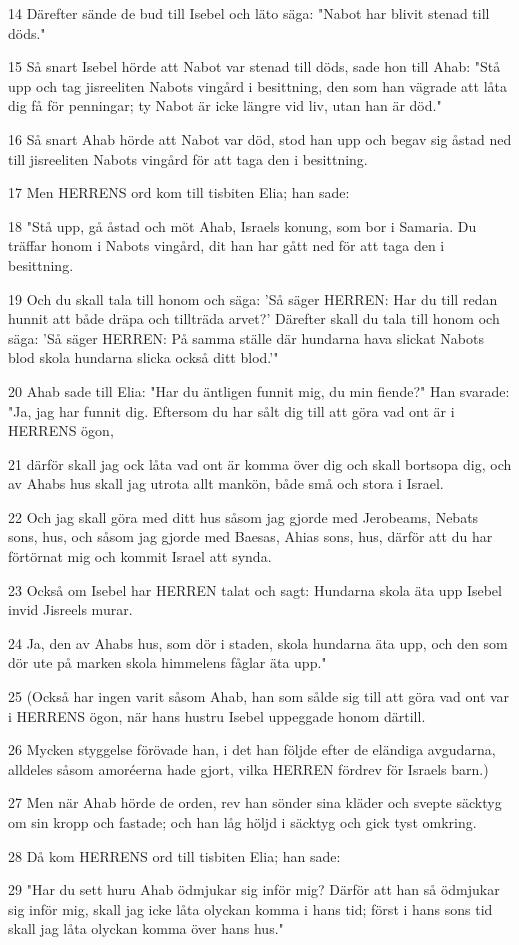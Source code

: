 \par 14 Därefter sände de bud till Isebel och läto säga: "Nabot har blivit stenad till döds."
\par 15 Så snart Isebel hörde att Nabot var stenad till döds, sade hon till Ahab: "Stå upp och tag jisreeliten Nabots vingård i besittning, den som han vägrade att låta dig få för penningar; ty Nabot är icke längre vid liv, utan han är död."
\par 16 Så snart Ahab hörde att Nabot var död, stod han upp och begav sig åstad ned till jisreeliten Nabots vingård för att taga den i besittning.
\par 17 Men HERRENS ord kom till tisbiten Elia; han sade:
\par 18 "Stå upp, gå åstad och möt Ahab, Israels konung, som bor i Samaria. Du träffar honom i Nabots vingård, dit han har gått ned för att taga den i besittning.
\par 19 Och du skall tala till honom och säga: 'Så säger HERREN: Har du till redan hunnit att både dräpa och tillträda arvet?' Därefter skall du tala till honom och säga: 'Så säger HERREN: På samma ställe där hundarna hava slickat Nabots blod skola hundarna slicka också ditt blod.'"
\par 20 Ahab sade till Elia: "Har du äntligen funnit mig, du min fiende?" Han svarade: "Ja, jag har funnit dig. Eftersom du har sålt dig till att göra vad ont är i HERRENS ögon,
\par 21 därför skall jag ock låta vad ont är komma över dig och skall bortsopa dig, och av Ahabs hus skall jag utrota allt mankön, både små och stora i Israel.
\par 22 Och jag skall göra med ditt hus såsom jag gjorde med Jerobeams, Nebats sons, hus, och såsom jag gjorde med Baesas, Ahias sons, hus, därför att du har förtörnat mig och kommit Israel att synda.
\par 23 Också om Isebel har HERREN talat och sagt: Hundarna skola äta upp Isebel invid Jisreels murar.
\par 24 Ja, den av Ahabs hus, som dör i staden, skola hundarna äta upp, och den som dör ute på marken skola himmelens fåglar äta upp."
\par 25 (Också har ingen varit såsom Ahab, han som sålde sig till att göra vad ont var i HERRENS ögon, när hans hustru Isebel uppeggade honom därtill.
\par 26 Mycken styggelse förövade han, i det han följde efter de eländiga avgudarna, alldeles såsom amoréerna hade gjort, vilka HERREN fördrev för Israels barn.)
\par 27 Men när Ahab hörde de orden, rev han sönder sina kläder och svepte säcktyg om sin kropp och fastade; och han låg höljd i säcktyg och gick tyst omkring.
\par 28 Då kom HERRENS ord till tisbiten Elia; han sade:
\par 29 "Har du sett huru Ahab ödmjukar sig inför mig? Därför att han så ödmjukar sig inför mig, skall jag icke låta olyckan komma i hans tid; först i hans sons tid skall jag låta olyckan komma över hans hus."

